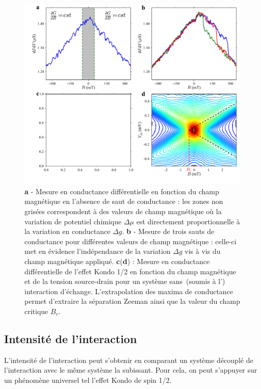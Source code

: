 \begin{figure}
\includegraphics[scale=0.45]{Resultats/Chap1/Figure2/figure2.pdf} 
\caption{\textbf{a} - Mesure en conductance différentielle en fonction du champ magnétique en l'absence de saut de conductance : les zones non grisées correspondent à des valeurs de champ magnétique où la variation de potentiel chimique $\Delta \mu$ est directement proportionnelle à la variation en conductance $\Delta g$. \textbf{b} - Mesure de trois sauts de conductance pour différentes valeurs de champ magnétique : celle-ci met en évidence l'indépendance de la variation $\Delta g$ vis à vis du champ magnétique appliqué. \textbf{c}(\textbf{d}) : Mesure en conductance différentielle de l'effet Kondo 1/2 en fonction du champ magnétique et de la tension source-drain pour un système sans~(soumis à l') interaction d'échange. L'extrapolation des maxima de conductance permet d'extraire la séparation Zeeman ainsi que la valeur du champ critique $B_c$.}
\label{analyse_interaction}
\end{figure}

\subsection{Intensité de l'interaction}
L'intensité de l'interaction peut s'obtenir en comparant un système découplé de l'interaction avec le même système la subissant. Pour cela, on peut s'appuyer sur un phénomène universel tel l'effet Kondo de spin 1/2.

